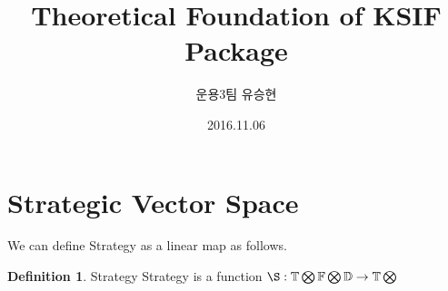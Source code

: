 \documentclass[a4paper, 10pt]{article}
\theoremstyle{definition}
\newtheorem{defn}{Definition}
\begin{document}
\title{Theoretical Foundation of KSIF Package}
\author{\normalsize{운용3팀 유승현} }
\date{2016.11.06}

\maketitle
	\section{Strategic Vector Space}
We can define Strategy as a linear map as follows.
		\begin{defn} Strategy
			Strategy is a function $\S : \mathbb{T} \bigotimes \mathbb{F} \bigotimes \mathbb{D} \rightarrow \mathbb{T} \bigotimes  $

		\end{defn}
\end{document}
